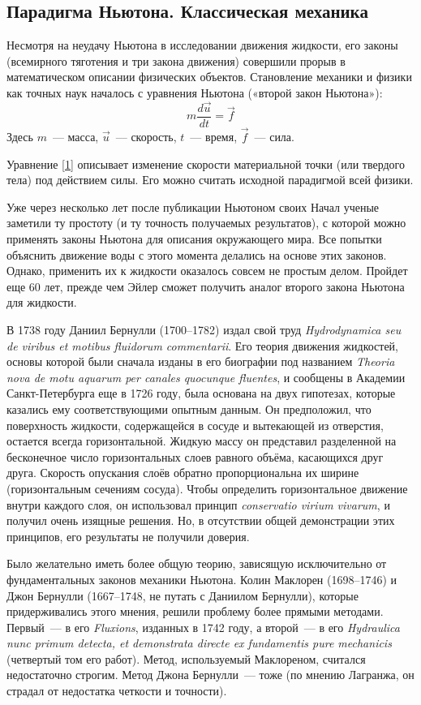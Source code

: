 \subsection{Парадигма Ньютона. Классическая механика}

Несмотря на неудачу Ньютона в исследовании движения жидкости, его законы (всемирного тяготения и три закона движения) 
совершили прорыв в математическом описании физических объектов. Становление механики и физики как точных наук началось с 
уравнения Ньютона («второй закон Ньютона»):
$$
	m \frac{d \vec u}{d t} = \vec f
	\label{1}
$$
Здесь $m$~--- масса, $\vec u$~--- скорость, $t$~--- время, $\vec f$~--- сила.

Уравнение \ref{1} описывает изменение скорости материальной точки (или твердого тела) под действием силы.
 Его можно считать исходной парадигмой всей физики.

Уже через несколько лет после публикации Ньютоном своих Начал ученые заметили ту простоту (и ту точность получаемых 
результатов), с которой можно применять законы Ньютона для описания окружающего мира. Все попытки объяснить движение 
воды с этого момента делались на основе этих законов. Однако, применить их к жидкости оказалось совсем не простым делом.
 Пройдет еще 60 лет, прежде чем Эйлер сможет получить аналог второго закона Ньютона для жидкости.

В 1738 году Даниил Бернулли (1700--1782) издал свой труд \textit{Hydrodynamica seu de viribus et motibus fluidorum
commentarii}. Его теория движения жидкостей, основы которой были сначала изданы в его биографии под названием 
\textit{Theoria nova de motu aquarum per canales quocunque fluentes}, и сообщены в Академии Санкт-Петербурга 
еще в 1726 году, была основана на двух гипотезах, которые казались ему соответствующими опытным данным. 
Он предположил, что поверхность жидкости, содержащейся в сосуде и вытекающей из отверстия, остается всегда
горизонтальной. Жидкую массу он представил разделенной на бесконечное число горизонтальных слоев равного объёма,
касающихся друг друга. Скорость опускания слоёв обратно пропорциональна их ширине (горизонтальным сечениям сосуда).
Чтобы определить горизонтальное движение внутри каждого слоя, он использовал принцип \textit{ conservatio virium
vivarum}, и получил очень изящные решения. Но, в отсутствии общей демонстрации этих принципов, его результаты не
получили доверия.

Было желательно иметь более общую теорию, зависящую исключительно от фундаментальных законов механики Ньютона. 
Колин Маклорен (1698--1746) и Джон Бернулли (1667--1748, не путать с Даниилом Бернулли), которые придерживались 
этого мнения, решили проблему более прямыми методами. Первый~--- в его \textit{Fluxions}, изданных в 1742 году, 
а второй~--- в его \textit{Hydraulica nunc primum detecta, et demonstrata directe ex fundamentis pure mechanicis} 
(четвертый том его работ). Метод, используемый Маклореном, считался недостаточно строгим. Метод Джона Бернулли~--- 
тоже (по мнению Лагранжа, он страдал от недостатка четкости и точности).

